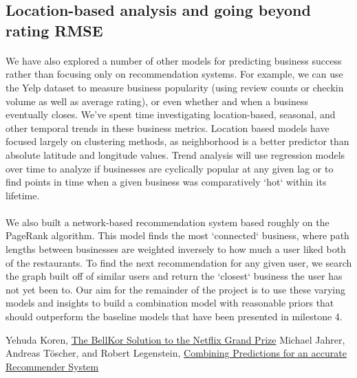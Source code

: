 \documentclass[11pt]{article}
\begin{document}
\subsection*{Location-based analysis and going beyond rating RMSE}

\paragraph{} We have also explored a number of other models for predicting business success rather than focusing only on recommendation systems. For example, we can use the Yelp dataset to measure business popularity (using review counts or checkin volume as well as average rating), or even whether and when a business eventually closes. We've spent time investigating location-based, seasonal, and other temporal trends in these business metrics. Location based models have focused largely on clustering methods, as neighborhood is a better predictor than absolute latitude and longitude values. Trend analysis will use regression models over time to analyze if businesses are cyclically popular at any given lag or to find points in time when a given business was comparatively `hot` within its lifetime.

\paragraph{} We also built a network-based recommendation system based roughly on the PageRank algorithm. This model finds the most `connected` business, where path lengths between businesses are weighted inversely to how much a user liked both of the restaurants. To find the next recommendation for any given user, we search the graph built off of similar users and return the `closest` business the user has not yet been to. Our aim for the remainder of the project is to use these varying models and insights to build a combination model with reasonable priors that should outperform the baseline models that have been presented in milestone 4.

\begin{thebibliography}{9}
  Yehuda Koren,
  \href{http://netflixprize.com/assets/GrandPrize2009_BPC_BellKor.pdf}{The BellKor Solution to the Netflix Grand Prize}
  Michael Jahrer, Andreas Töscher, and Robert Legenstein,
  \href{http://www.igi.tugraz.at/psfiles/JahrerETAL_2010.pdf}{Combining Predictions for an accurate Recommender System}

\end{thebibliography}
\end{document}
